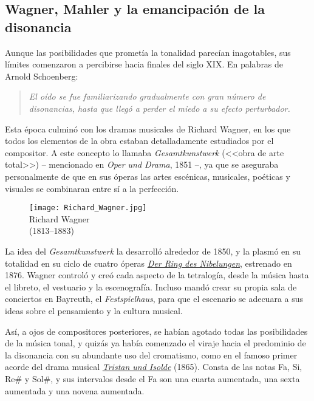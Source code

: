\subsection{Wagner, Mahler y la emancipación de la disonancia}
Aunque las posibilidades que prometía la tonalidad parecían inagotables, sus límites comenzaron a percibirse hacia finales del siglo XIX. En palabras de Arnold Schoenberg:
\begin{quote}
\emph{El oído se fue familiarizando gradualmente con gran número de disonancias, hasta que llegó a perder el miedo a su efecto perturbador.}\\
\end{quote}

Esta época culminó con los dramas musicales de Richard Wagner, en los que todos los elementos de la obra estaban detalladamente estudiados por el compositor. A este concepto lo llamaba \emph{Gesamtkunstwerk} (<<{obra de arte total}>>) -- mencionado en {\emph{Oper und Drama}, 1851} --, ya que se aseguraba personalmente de que en sus óperas las artes escénicas, musicales, poéticas y visuales se combinaran entre sí a la perfección.

\begin{figure}[h]
\begin{center}
\texttt{[image: Richard\_Wagner.jpg]}\\
{Richard Wagner\\(1813--1883)}
\end{center}
\end{figure}

La idea del \emph{Gesamtkunstwerk} la desarrolló alrededor de 1850, y la plasmó en su totalidad en su ciclo de cuatro óperas \href{https://www.youtube.com/watch?v=1PBhlPeTJ_g}{\textit{Der Ring des Nibelungen}}, estrenado en 1876. Wagner controló y creó cada aspecto de la tetralogía, desde la música hasta el libreto, el vestuario y la escenografía. Incluso mandó crear su propia sala de conciertos en Bayreuth, el \emph{Festspielhaus}, para que el escenario se adecuara a sus ideas sobre el pensamiento y la cultura musical. 
%
\cite{kinney}

Así, a ojos de compositores posteriores, se habían agotado todas las posibilidades de la música tonal, y quizás ya había comenzado el viraje hacia el predominio de la disonancia con su abundante uso del cromatismo, como en el famoso primer acorde del drama musical \href{https://www.youtube.com/watch?v=SF4zN-Okonc}{\textit{Tristan und Isolde}} (1865). Consta de las notas Fa, Si, $\mbox{Re\#}$ y $\mbox{Sol\#}$, y sus intervalos desde el Fa son una cuarta aumentada, una sexta aumentada y una novena aumentada.

